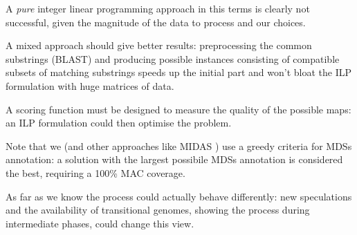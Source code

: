 A \textit{pure} integer linear programming approach in this terms is clearly not successful, given the magnitude of the data to process and our choices.

A mixed approach should give better results: preprocessing the common substrings (BLAST) and producing possible instances consisting of compatible subsets of matching substrings speeds up the initial part and won't bloat the ILP formulation with huge matrices of data.

A scoring function must be designed to measure the quality of the possible maps: an ILP formulation could then optimise the problem.

Note that we (and other approaches like MIDAS \cite{midas}) use a greedy criteria for MDSs annotation: a solution with the largest possibile MDSs annotation is considered the best, requiring a 100\% MAC coverage.

As far as we know the process could actually behave differently: new speculations and the availability of transitional genomes, showing the process during intermediate phases, could change this view.